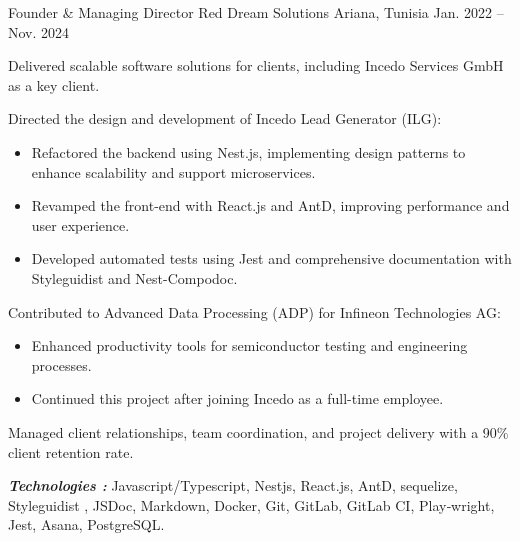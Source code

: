 \begin{cventries}
  \cventry
    {Founder \& Managing Director} %
    {Red Dream Solutions} %
    {Ariana, Tunisia} %
    {Jan. 2022 – Nov. 2024} %
    {
      \begin{cvitems} %
        \item {Delivered scalable software solutions for clients, including Incedo Services GmbH as a key client.}
        \item {Directed the design and development of Incedo Lead Generator (ILG):
        \begin{itemize}
          \item{Refactored the backend using Nest.js, implementing design patterns
          to enhance scalability and support microservices.}
          \item{Revamped the front-end with React.js and AntD, improving performance and user experience.}
          \item{Developed automated tests using Jest and comprehensive documentation with Styleguidist and Nest-Compodoc.}
        \end{itemize}
        }
        \item {Contributed to Advanced Data Processing (ADP) for Infineon Technologies AG:
          \begin{itemize}
            \item{Enhanced productivity tools for semiconductor testing and engineering processes.}
            \item{Continued this project after joining Incedo as a full-time employee.}
          \end{itemize}
        }
        \item {Managed client relationships, team coordination, and project delivery with a 90\% client retention rate.}
       \end{cvitems}
       \vspace{5mm}
      \textbf{\textit{Technologies :}} Javascript/Typescript, Nestjs, React.js, AntD, sequelize, Styleguidist ,
       JSDoc, Markdown, Docker, Git, GitLab, GitLab CI, Play‐wright, Jest, Asana, PostgreSQL.
      \vspace{5mm}
    }


\end{cventries}
